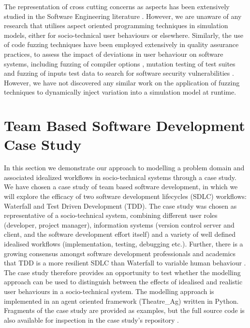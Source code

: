 \documentclass{llncs}
\begin{document}
The representation of cross cutting concerns as aspects has been extensively studied in the Software Engineering
literature \citep{Ali2012Aspect}.  However, we are unaware of any research that utilises aspect oriented programming
techniques in simulation models, either for socio-technical user behaviours or elsewhere.  Similarly, the use of code
fuzzing techniques have been employed extensively in quality assurance practices, to assess the impact of deviations in user
behaviour on software systems, including fuzzing of compiler options \citep{fuzzing-compiler}, mutation testing of test
suites \cite{demillo78hints} and fuzzing of inputs test data to search for software security vulnerabilities
\citep{takanen08fuzzing}.  However, we have not discovered any similar work on the application of fuzzing techniques to
dynamically inject variation into a simulation model at runtime.


\section{Team Based Software Development Case Study}
\label{sec:case-study}


In this section we demonstrate our approach to modelling a problem domain and associated idealized workflows in
socio-technical systems through a case study.  We have chosen a case study of team based software development, in which
we will explore the efficacy of two software development lifecycles (SDLC) workflows: Waterfall and Test Driven
Development (TDD).  The case study was chosen as representative of a socio-technical system, combining different user
roles (developer, project manager), information systems (version control server and client, and the software development
effort itself) and a variety of well defined idealised workflows (implementation, testing, debugging etc.).  Further,
there is a growing consensus amongst software development professionals and academics that TDD is a more resilient SDLC
than Waterfall to variable human behaviour
\citep{Bhat2006TestDrivenDevelopment,George2004TestDrivenDevelopment,Huang2009EmpiricalTestFirstProgramming}.  The case
study therefore provides an opportunity to test whether the modelling approach can be used to distinguish between the
effects of idealised and realistic user behaviours in a socio-technical system.  The modelling approach is implemented
in an agent oriented framework (Theatre\_Ag) written in Python.  Fragments of the case study are provided as examples,
but the full source code is also available for inspection in the case study's repository 
\cite{storer2016softdev-workflow-scm}.
\end{document}

